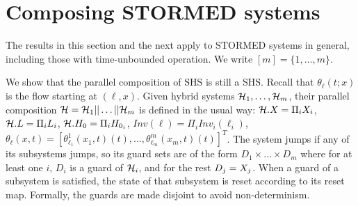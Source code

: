 \section{Composing STORMED systems}
\label{sec:compositionality}
The results in this section and the next apply to STORMED systems in general, including those with time-unbounded operation.
We write $[m] = \{1,\ldots,m\}$.

We show that the parallel composition of SHS is still a SHS.
Recall that $\theta_{\ell}(t;x)$ is the flow starting at $(\ell,x)$.
Given hybrid systems $\mathcal{H}_1,\ldots,\mathcal{H}_m$, their parallel composition $\mathcal{H} = \mathcal{H}_1 || \ldots ||\mathcal{H}_m$ is defined in the usual way:
$\mathcal{H}.X = \Pi_i X_i$,
$\mathcal{H}.L = \Pi_i L_i$,
$\mathcal{H}.H_0 =\Pi_i H_{0_i}$,
$Inv(\ell) = \Pi_{i}Inv_i(\ell_i)$,
$\theta_{\ell}(x,t)= [\theta_{\ell_1}^1(x_1,t)(t),\ldots,\theta_{\ell_m}^m(x_m,t)(t) ]^T$.
The system jumps if any of its subsystems jumps, so its guard sets are of the form 
$D_1\times\ldots \times D_m$ where for at least one $i$, $D_i$ is a guard of $\mathcal{H}_i$, and for the rest $D_j =X_j$.
When a guard of a subsystem is satisfied, the state of that subsystem is reset according to its reset map.
Formally, the guards are made disjoint to avoid non-determinism.


